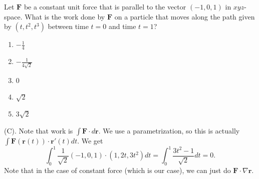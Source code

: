 \begin{exercise}
Let $\mathbf{F}$ be a constant unit force that is parallel to the vector
$(-1,0,1)$ in $xyz$-space. What is the work done by $\mathbf{F}$ on a
particle that moves along the path given by
$(t,t^2,t^3)$ between time $t=0$ and time $t=1$?

\begin{enumerate}[label=(\Alph*)]
    \item $\displaystyle -\frac{1}{4}$
    \item $\displaystyle -\frac{1}{4\sqrt{2}}$
    \item $0$
    \item $\sqrt{2}$
    \item $3\sqrt{2}$
\end{enumerate}
\end{exercise}
\begin{solution}
(C). Note that work is $\int \mathbf{F} \cdot d \mathbf{r}$.
We use a parametrization, so this is actually 
$\int \mathbf{F}(\mathbf{r}(t)) \cdot \mathbf{r}'(t) dt$.
We get
\[
\int_0^1 \frac{1}{\sqrt{2}} (-1,0,1) \cdot (1, 2t, 3t^2) dt 
= \int_0^1 \frac{3t^2 - 1}{\sqrt{2}} dt
= 0.
\]
Note that in the case of constant force (which is our case), we can 
just do $\mathbf{F} \cdot \nabla \mathbf{r}$.
\end{solution}

